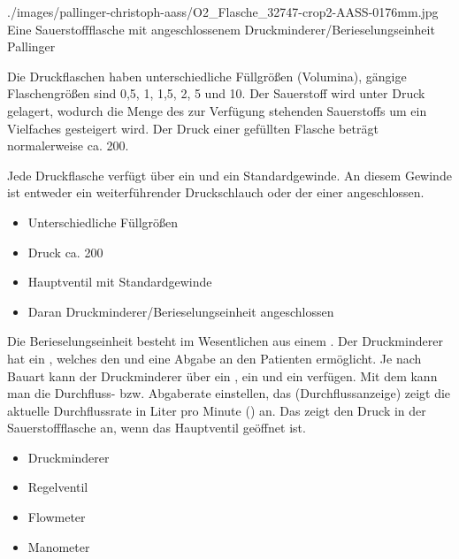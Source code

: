 {}%
{}%
{./images/pallinger-christoph-aass/O2_Flasche_32747-crop2-AASS-0176mm.jpg}%
{Eine Sauerstoffflasche mit angeschlossenem
Druckminderer/Berieselungseinheit}%
{Pallinger}%


{Die Druckflaschen haben unterschiedliche Füllgrößen
(Volumina), gängige Flaschengrößen sind 0,5, 1, 1,5, 2, 5
und
10\Liter*. Der Sauerstoff wird unter Druck gelagert, wodurch
die Menge des zur Verfügung stehenden Sauerstoffs um ein Vielfaches
gesteigert wird. Der Druck einer gefüllten Flasche beträgt
normalerweise ca. 200\Bar*. 

Jede Druckflasche verfügt über ein  und
ein Standardgewinde. An diesem Gewinde ist entweder ein
weiterführender Druckschlauch oder der 
einer  angeschlossen.

\bigskip }
{
\begin{itemize}
  \item Unterschiedliche Füllgrößen
  \item Druck ca. 200\Bar*
  \item Hauptventil mit Standardgewinde
  \item Daran Druckminderer/Berieselungseinheit
  angeschlossen
\end{itemize}
}
{}
{}
{}


{
Die Berieselungseinheit besteht im Wesentlichen aus einem
. Der Druckminderer hat ein
, welches den  und eine
Abgabe an den Patienten ermöglicht. Je nach Bauart kann der
Druckminderer über ein , ein
 und ein 
verfügen.  Mit dem  kann man die Durchfluss-
bzw. Abgaberate ein\-stellen,  das 
(Durchflussanzeige) zeigt die aktuelle Durchflussrate in 
Liter pro Minute (\LPerMin) an. Das   zeigt den
Druck in der Sauerstoffflasche an, wenn das Hauptventil
geöffnet ist.}
{
\begin{itemize}
  \item Druckminderer
  \item Regelventil
  \item Flowmeter  \LPerMin
  \item Manometer  \Bar
\end{itemize}
}
{}
{}
{}






